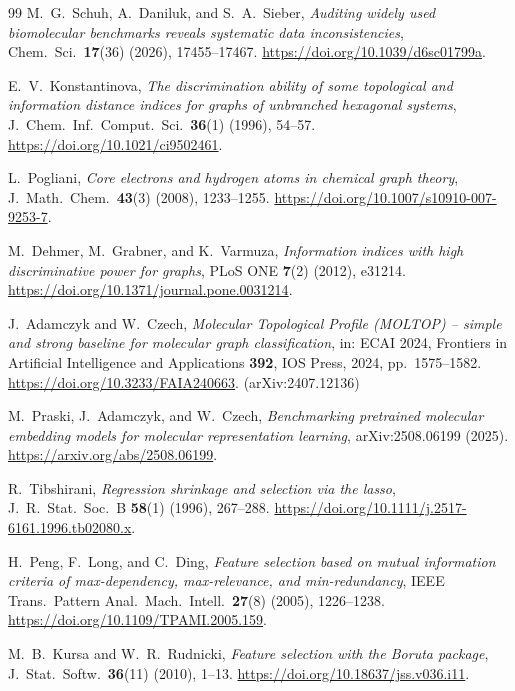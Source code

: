 \documentclass[11pt,a4paper]{article}
\theoremstyle{definition}
\begin{document}
\begin{thebibliography}{99}
M.~G.~Schuh, A.~Daniluk, and S.~A.~Sieber,
\emph{Auditing widely used biomolecular benchmarks reveals systematic data inconsistencies},
Chem.~Sci.~\textbf{17}(36) (2026), 17455--17467.
\url{https://doi.org/10.1039/d6sc01799a}.

E.~V.~Konstantinova,
\emph{The discrimination ability of some topological and information distance indices for graphs of unbranched hexagonal systems},
J.~Chem.~Inf.~Comput.~Sci.~\textbf{36}(1) (1996), 54--57.
\url{https://doi.org/10.1021/ci9502461}.

L.~Pogliani,
\emph{Core electrons and hydrogen atoms in chemical graph theory},
J.~Math.~Chem.~\textbf{43}(3) (2008), 1233--1255.
\url{https://doi.org/10.1007/s10910-007-9253-7}.

M.~Dehmer, M.~Grabner, and K.~Varmuza,
\emph{Information indices with high discriminative power for graphs},
PLoS ONE \textbf{7}(2) (2012), e31214.
\url{https://doi.org/10.1371/journal.pone.0031214}.

J.~Adamczyk and W.~Czech,
\emph{Molecular Topological Profile (MOLTOP) -- simple and strong baseline for molecular graph classification},
in: ECAI 2024, Frontiers in Artificial Intelligence and Applications \textbf{392}, IOS Press, 2024, pp.~1575--1582.
\url{https://doi.org/10.3233/FAIA240663}.
(arXiv:2407.12136)

M.~Praski, J.~Adamczyk, and W.~Czech,
\emph{Benchmarking pretrained molecular embedding models for molecular representation learning},
arXiv:2508.06199 (2025).
\url{https://arxiv.org/abs/2508.06199}.

R.~Tibshirani,
\emph{Regression shrinkage and selection via the lasso},
J.~R.~Stat.~Soc.~B \textbf{58}(1) (1996), 267--288.
\url{https://doi.org/10.1111/j.2517-6161.1996.tb02080.x}.

H.~Peng, F.~Long, and C.~Ding,
\emph{Feature selection based on mutual information criteria of
max-dependency, max-relevance, and min-redundancy},
IEEE Trans.~Pattern Anal.~Mach.~Intell.~\textbf{27}(8) (2005),
1226--1238. \url{https://doi.org/10.1109/TPAMI.2005.159}.

M.~B.~Kursa and W.~R.~Rudnicki,
\emph{Feature selection with the Boruta package},
J.~Stat.~Softw.~\textbf{36}(11) (2010), 1--13.
\url{https://doi.org/10.18637/jss.v036.i11}.


\end{thebibliography}
\end{document}

